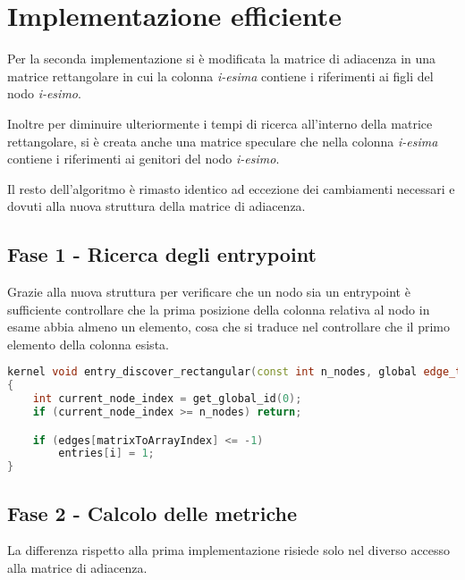 \documentclass[../relazione.tex]{subfiles}
\begin{document}
\section{Implementazione efficiente}
Per la seconda implementazione si è modificata la matrice di adiacenza in una matrice rettangolare in cui la colonna \textit{i-esima} contiene i riferimenti ai figli del nodo \textit{i-esimo}.

Inoltre per diminuire ulteriormente i tempi di ricerca all'interno della matrice rettangolare, si è creata anche una matrice speculare che nella colonna \textit{i-esima} contiene i riferimenti ai genitori del nodo \textit{i-esimo}.

Il resto dell'algoritmo è rimasto identico ad eccezione dei cambiamenti necessari e dovuti alla nuova struttura della matrice di adiacenza.

\subsection{Fase 1 - Ricerca degli entrypoint}
Grazie alla nuova struttura per verificare che un nodo sia un entrypoint è sufficiente controllare che la prima posizione della colonna relativa al nodo in esame abbia almeno un elemento, cosa che si traduce nel controllare che il primo elemento della colonna esista. 
\begin{lstlisting}[language=C++, caption={Find entrypoints kernel II},captionpos=b]
kernel void entry_discover_rectangular(const int n_nodes, global edge_t* restrict edges, volatile global int* n_entries, global int* entries)
{
	int current_node_index = get_global_id(0);
	if (current_node_index >= n_nodes) return;

	if (edges[matrixToArrayIndex] <= -1)
		entries[i] = 1;
}
\end{lstlisting}

\subsection{Fase 2 - Calcolo delle metriche}
La differenza rispetto alla prima implementazione risiede solo nel diverso accesso alla matrice di adiacenza.
\end{document}

